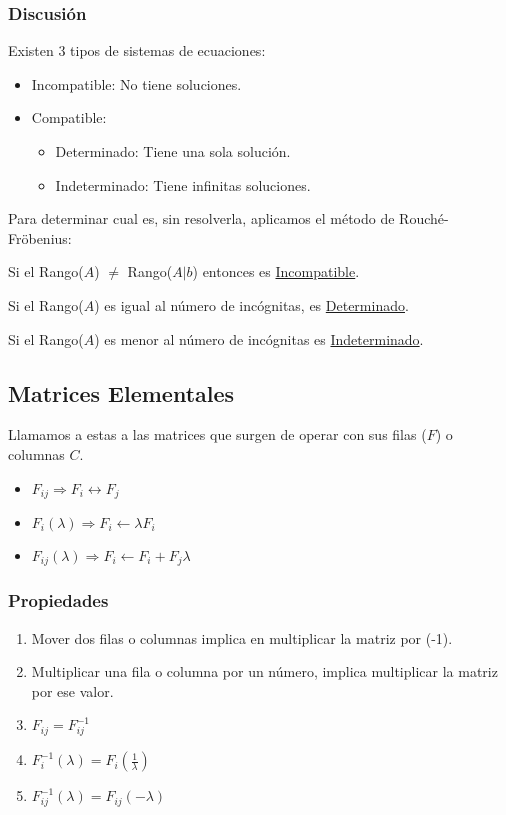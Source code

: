 \subsubsection{Discusión}
Existen 3 tipos de sistemas de ecuaciones:
\begin{itemize}
        \item Incompatible: No tiene soluciones.
        \item Compatible:
              \begin{itemize}
                      \item Determinado: Tiene una sola solución.
                      \item Indeterminado: Tiene infinitas soluciones.
              \end{itemize}
\end{itemize}
Para determinar cual es, sin resolverla, aplicamos el método de Rouché-Fröbenius:
\par \hspace{1em} Si el Rango(\(A\)) \( \neq \) Rango(\(A|b\)) entonces es \underline{Incompatible}.
\par \hspace{1em} Si el Rango(\(A\)) es igual al número de incógnitas, es \underline{Determinado}.
\par \hspace{1em} Si el Rango(\(A\)) es menor al número de incógnitas es \underline{Indeterminado}.
\subsection{Matrices Elementales}
Llamamos a estas a las matrices que surgen de operar con sus filas (\(F\)) o columnas \(C\).
\begin{itemize}
        \item \(F_{ij} \Rightarrow   F_i \leftrightarrow F_j\)
        \item \(F_i(\lambda) \Rightarrow   F_i \leftarrow \lambda F_i\)
        \item \(F_{ij}(\lambda) \Rightarrow F_i \leftarrow F_i + F_j \lambda \)
\end{itemize}
\subsubsection{Propiedades}
\begin{enumerate}
        \item Mover dos filas o columnas implica en multiplicar la matriz por (-1).
        \item Multiplicar una fila o columna por un número, implica multiplicar la matriz por ese valor.
        \item \(F_{ij} = F^{-1}_{ij}\)
        \item \(F^{-1}_i(\lambda) = F_i(\frac{1}{\lambda})\)
        \item \(F^{-1}_{ij}(\lambda) = F_{ij}(-\lambda)\)
\end{enumerate}
